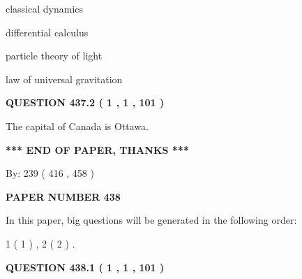 \documentclass[12pt]{article}
\begin{document}
 
classical dynamics
 
 
differential calculus
 
 
particle theory of light
 
 
law of universal gravitation
 
 
 
 
  
\vspace{0.2in}
  
{\textbf{\Large{QUESTION
437.2 
 ( 1 , 1 , 101 )
}}}
  
  
 
 
\noindent{}
 
 
The capital of Canada is Ottawa.
 
 
 
 
   
   
\vspace{1.0in} 
{\textbf{\large{ *** END OF PAPER, THANKS *** }}} 
   
   
\hspace{1.0in} By: 
 239 ( 416 ,  458 )
   
   
   
   
\newpage 
\setcounter{page}{ 
   438001 } 
   
   
   
   
 {\textbf{ \Large{ PAPER NUMBER  438  }}}
   
   
\vspace{0.2in}
   
   
   
   
   
\vspace{0.2in}
   
In this paper, big questions will be generated in the following order: 
   
   
   1 ( 1 )
 ,
   2 ( 2 )
 .
  
\vspace{0.2in}
  
{\textbf{\Large{QUESTION
438.1 
 ( 1 , 1 , 101 )
}}}
  
  
 
 
\noindent{}
 
\end{document}
